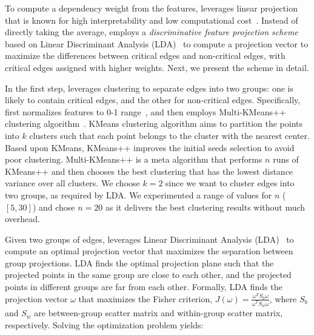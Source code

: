 To compute a dependency weight from the features, \tool leverages linear projection that is known for high interpretability and low computational cost~\cite{friedman2001elements}.
Instead of directly taking the average,
\tool employs a \emph{discriminative feature projection scheme} based on Linear Discriminant Analysis (LDA)~\cite{Mika99fisherdiscriminant} to compute a projection vector to maximize the differences between critical edges and non-critical edges, with critical edges assigned with higher weights.
%
Next, we present the scheme in detail.



In the first step, \tool leverages clustering to separate edges into two groups: one is likely to contain critical edges, and the other for non-critical edges.
%
%
Specifically, \tool first normalizes features to 0-1 range~\cite{friedman2001elements}, and then employs Multi-KMeans++ clustering algorithm~\cite{Arthur:2007:KAC:1283383.1283494}.
KMeans clustering algorithm aims to partition the points into $k$ clusters such that each point belongs to the cluster with the nearest center.
Based upon KMeans, KMeans++ improves the initial seeds selection to avoid poor clustering.
Multi-KMeans++ is a meta algorithm that performs $n$ runs of KMeans++ and then chooses the best clustering that has the lowest distance variance over all clusters.
We choose $k=2$ since we want to cluster edges into two groups, as required by LDA.
We experimented a range of values for $n$ ($[5, 30]$) and chose $n=20$ as it delivers the best clustering results without much overhead.




Given two groups of edges, \tool leverages Linear Discriminant Analysis (LDA)~\cite{Mika99fisherdiscriminant} to compute an optimal projection vector that maximizes the separation between group projections.
%
LDA finds the optimal projection plane such that the projected points in the same group are close to each other, and the projected points in different groups are far from each other.
%
Formally, LDA finds the projection vector $\omega$ that maximizes the Fisher criterion, $J(\omega) = \frac{\omega^TS_b\omega}{\omega^TS_w\omega}$, where $S_b$ and $S_w$ are between-group scatter matrix and within-group scatter matrix, respectively. 
%
Solving the optimization problem yields:

